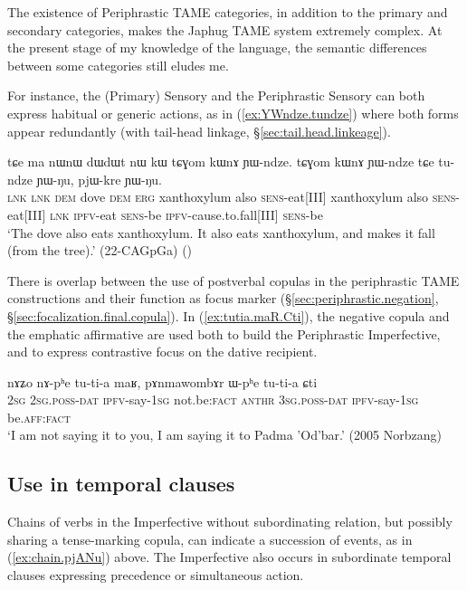 The existence of Periphrastic TAME categories, in addition to the primary and secondary categories, makes the Japhug TAME system extremely complex. At the present stage of my knowledge of the language, the semantic differences between some categories still eludes me.

For instance, the (Primary) Sensory and the Periphrastic Sensory can both express habitual or generic actions, as in (\ref{ex:YWndze.tundze}) where both forms appear redundantly (with tail-head linkage, §\ref{sec:tail.head.linkeage}).

\begin{exe}
\ex \label{ex:YWndze.tundze}
\gll tɕe ma nɯnɯ dɯdɯt nɯ kɯ tɕɣom kɯnɤ ɲɯ-ndze. tɕɣom kɯnɤ ɲɯ-ndze tɕe tu-ndze ɲɯ-ŋu, pjɯ-kre ɲɯ-ŋu. \\
\textsc{lnk} \textsc{lnk} \textsc{dem} dove \textsc{dem} \textsc{erg} xanthoxylum also \textsc{sens}-eat[III]  xanthoxylum also \textsc{sens}-eat[III] \textsc{lnk} \textsc{ipfv}-eat \textsc{sens}-be \textsc{ipfv}-cause.to.fall[III] \textsc{sens}-be \\
\glt `The dove also eats xanthoxylum. It also eats xanthoxylum, and makes it fall (from the tree).' (22-CAGpGa)
()
\end{exe}

There is overlap between the use of postverbal copulas in the periphrastic TAME constructions and their function as focus marker (§\ref{sec:periphrastic.negation}, §\ref{sec:focalization.final.copula}). In (\ref{ex:tutia.maR.Cti}), the negative copula  and the emphatic affirmative  are used both to build the Periphrastic Imperfective, and to express contrastive focus on the dative recipient.


\begin{exe}
\ex \label{ex:tutia.maR.Cti}
\gll nɤʑo nɤ-pʰe tu-ti-a maʁ, pɤnmawombɤr ɯ-pʰe tu-ti-a ɕti \\
\textsc{2sg} \textsc{2sg}.\textsc{poss}-\textsc{dat} \textsc{ipfv}-say-\textsc{1sg} not.be:\textsc{fact}  \textsc{anthr} \textsc{3sg}.\textsc{poss}-\textsc{dat}  \textsc{ipfv}-say-\textsc{1sg} be.\textsc{aff}:\textsc{fact} \\
\glt `I am not saying it to you, I am saying it to Padma 'Od'bar.' (2005 Norbzang)
\end{exe}

\subsection{Use in temporal clauses} \label{sec:ipfv.temporal}
Chains of verbs in the Imperfective without subordinating relation, but possibly sharing a tense-marking copula, can indicate a succession of events, as in (\ref{ex:chain.pjANu}) above. The Imperfective also occurs in subordinate temporal clauses expressing precedence or simultaneous action.

